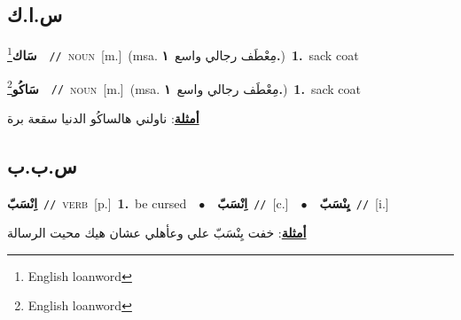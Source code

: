 \documentclass[10pt,a4paper,twoside]{article} %
\begin{document}
\begin{multicols}{2}
\vspace{-3mm}
\subsection*{\color{blue}\foreignlanguage{arabic}{س.ا.ك}\color{blue}{ (ntws)}} 

{\setlength\topsep{0pt}\textbf{\foreignlanguage{arabic}{سَاك}}\footnote{English loanword}\ \ {\color{gray}\texttt{//}\color{black}}\ \textsc{noun}\ [m.]\ \color{gray}(msa. \foreignlanguage{arabic}{مِعْطَف رجالي واسع}~\foreignlanguage{arabic}{\textbf{١.}})\color{black}\ \textbf{1.}~sack coat\ } \vspace{2mm}

{\setlength\topsep{0pt}\textbf{\foreignlanguage{arabic}{سَاكُو}}\footnote{English loanword}\ \ {\color{gray}\texttt{//}\color{black}}\ \textsc{noun}\ [m.]\ \color{gray}(msa. \foreignlanguage{arabic}{مِعْطَف رجالي واسع}~\foreignlanguage{arabic}{\textbf{١.}})\color{black}\ \textbf{1.}~sack coat\  \begin{flushright}\color{gray}\foreignlanguage{arabic}{\textbf{\underline{\foreignlanguage{arabic}{أمثلة}}}: ناولني هالساكُو الدنيا سقعة برة}\end{flushright}\color{black}} \vspace{2mm}

\vspace{-3mm}
\subsection*{\color{blue}\foreignlanguage{arabic}{س.ب.ب}\color{blue}{}} 

{\setlength\topsep{0pt}\textbf{\foreignlanguage{arabic}{اِنْسَبّ}}\ {\color{gray}\texttt{//}\color{black}}\ \textsc{verb}\ [p.]\ \textbf{1.}~be cursed\ \ $\bullet$\ \ \setlength\topsep{0pt}\textbf{\foreignlanguage{arabic}{اِنْسَبّ}}\ {\color{gray}\texttt{//}\color{black}}\ [c.]\ \ $\bullet$\ \ \setlength\topsep{0pt}\textbf{\foreignlanguage{arabic}{يِنْسَبّ}}\ {\color{gray}\texttt{//}\color{black}}\ [i.]\  \begin{flushright}\color{gray}\foreignlanguage{arabic}{\textbf{\underline{\foreignlanguage{arabic}{أمثلة}}}: خفت يِنْسَبّ علي وعأهلي عشان هيك محيت الرسالة}\end{flushright}\color{black}} \vspace{2mm}


\end{multicols}
\end{document}
